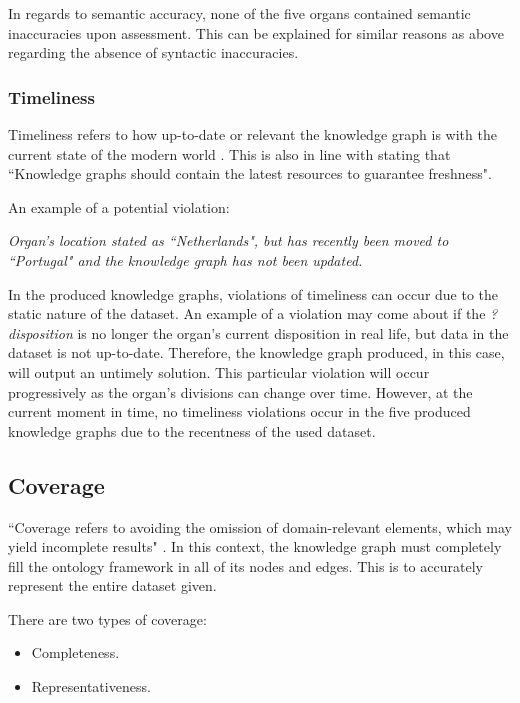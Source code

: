 In regards to semantic accuracy, none of the five organs contained semantic inaccuracies upon assessment. This can be explained for similar reasons as above regarding the absence of syntactic inaccuracies. 

\subsubsection{Timeliness}
\hspace{0.5cm} Timeliness refers to how up-to-date or relevant the knowledge graph is with the current state of the modern world \cite{knowledgegraphevaulationbook}. This is also in line with \cite{evaluationpaper} stating that ``Knowledge graphs should contain the latest resources to guarantee freshness".

\noindent An example of a potential violation:
\begin{displayquote}
    \textit{Organ's location stated as ``Netherlands", but has recently been moved to ``Portugal" and the knowledge graph has not been updated.}
\end{displayquote}

In the produced knowledge graphs, violations of timeliness can occur due to the static nature of the dataset. An example of a violation may come about if the \textit{?disposition} is no longer the organ's current disposition in real life, but data in the dataset is not up-to-date. Therefore, the knowledge graph produced, in this case, will output an untimely solution. This particular violation will occur progressively as the organ's divisions can change over time. However, at the current moment in time, no timeliness violations occur in the five produced knowledge graphs due to the recentness of the used dataset.

\subsection{Coverage}
\hspace{0.5cm} ``Coverage refers to avoiding the omission of domain-relevant elements, which may yield incomplete results" \cite{knowledgegraphevaulationbook}. In this context, the knowledge graph must completely fill the ontology framework in all of its nodes and edges. This is to accurately represent the entire dataset given. 

\noindent There are two types of coverage: 

\vspace{-0.15cm}
\begin{itemize}
\itemsep0em 
\item Completeness.
\vspace{-0.1cm}
\item Representativeness.
\end{itemize}
\vspace{-0.4cm}

